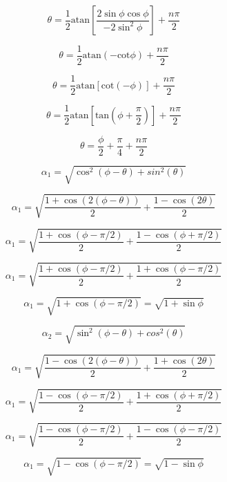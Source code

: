 \documentclass{article}
\begin{document}
\begin{equation}
	\theta = \frac{1}{2}\text{atan}\left[\frac{2\sin\phi\cos\phi}{-2\sin^2\phi}\right]+\frac{n\pi}{2}
\end{equation}

\begin{equation}
	\theta = \frac{1}{2}\text{atan}(-\text{cot}\phi)+\frac{n\pi}{2}
\end{equation}

\begin{equation}
	\theta = \frac{1}{2}\text{atan}[\text{cot}(-\phi)]+\frac{n\pi}{2}
\end{equation}

\begin{equation}
	\theta = \frac{1}{2}\text{atan}\left[\text{tan}\left(\phi+\frac{\pi}{2}\right)\right]+\frac{n\pi}{2}
\end{equation}

\begin{equation}
	\theta = \frac{\phi}{2}+\frac{\pi}{4}+\frac{n\pi}{2}
\end{equation}

\begin{equation}
	\alpha_1 = \sqrt{\cos^2(\phi-\theta)+sin^2(\theta)}
\end{equation}

\begin{equation}
	\alpha_1 = \sqrt{\frac{1+\cos(2(\phi-\theta))}{2}+\frac{1-\cos(2\theta)}{2}}
\end{equation}

\begin{equation}
	\alpha_1 = \sqrt{\frac{1+\cos(\phi-\pi/2)}{2}+\frac{1-\cos(\phi+\pi/2)}{2}}
\end{equation}

\begin{equation}
	\alpha_1 = \sqrt{\frac{1+\cos(\phi-\pi/2)}{2}+\frac{1+\cos(\phi-\pi/2)}{2}}
\end{equation}

\begin{equation}
	\alpha_1 = \sqrt{1+\cos(\phi-\pi/2)} = \sqrt{1+\sin\phi}
\end{equation}

\begin{equation}
	\alpha_2 = \sqrt{\sin^2(\phi-\theta)+cos^2(\theta)}
\end{equation}

\begin{equation}
	\alpha_1 = \sqrt{\frac{1-\cos(2(\phi-\theta))}{2}+\frac{1+\cos(2\theta)}{2}}
\end{equation}

\begin{equation}
	\alpha_1 = \sqrt{\frac{1-\cos(\phi-\pi/2)}{2}+\frac{1+\cos(\phi+\pi/2)}{2}}
\end{equation}

\begin{equation}
	\alpha_1 = \sqrt{\frac{1-\cos(\phi-\pi/2)}{2}+\frac{1-\cos(\phi-\pi/2)}{2}}
\end{equation}

\begin{equation}
	\alpha_1 = \sqrt{1-\cos(\phi-\pi/2)} = \sqrt{1-\sin\phi}
\end{equation}
\end{document}
